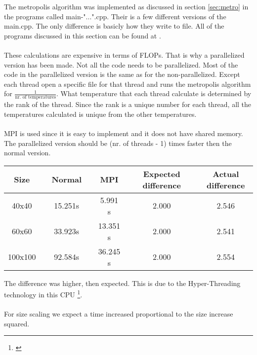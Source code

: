 
The metropolis algorithm was implemented as discussed in section \ref{sec:metro} in the programs called main-"...".cpp. Their is a few different versions of the main.cpp. The only difference is basicly how they write to file. All of the programs discussed in this section can be found at \href{https://github.com/erikfsk/Project-4/tree/master/Project4}{\color{blue}{github}}.
\\
\\
These calculations are expensive in terms of FLOPs. That is why a parallelized version has been made. Not all the code needs to be parallelized. Most of the code in the parallelized version is the same as for the non-parallelized. Except each thread open a specific file for that thread and runs the metropolis algorithm for $\frac{1}{\text{nr. of temperatures}}$. What temperature that each thread calculate is determined by the rank of the thread. Since the rank is a unique number for each thread, all the temperatures calculated is unique from the other temperatures.
\\
\\
MPI is used since it is easy to implement and it does not have shared memory. The parallelized version should be (nr. of threads - 1) times faster then the normal version.

\begin{center}
\label{tab:parallell}
\begin{tabularx}{\textwidth}{c X c X c X c X c}
    \hline
    \hline
        Size && Normal && MPI && Expected difference && Actual difference\\
    \hline
        40x40   	&&      15.251s	&&		5.991 s 	&&	2.000	&&	2.546	\\
        60x60   	&&      33.923s	&&		13.351 s	&&	2.000	&&	2.541	\\
        100x100   	&&      92.584s	&&		36.245 s	&&	2.000	&&	2.554	\\
    \hline
\end{tabularx}
\end{center}

The difference was higher, then expected. This is due to the Hyper-Threading technology in this CPU \footnote{\href{https://www.intel.com/content/www/us/en/architecture-and-technology/hyper-threading/hyper-threading-technology.html}{\color{blue}{Intel Hyper-Threading Technology}}}.
\\
\\
For size scaling we expect a time increased proportional to the size increase squared.

